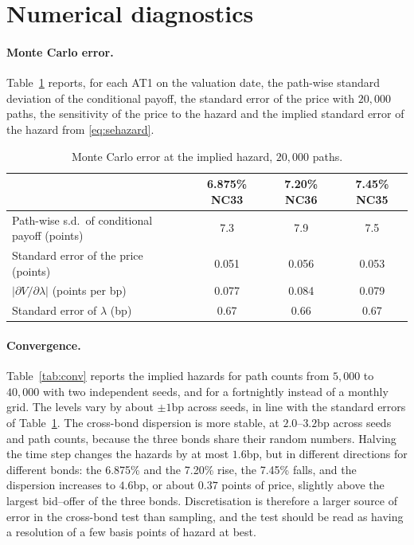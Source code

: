 

\section{Numerical diagnostics}\label{app:numerics}

\paragraph{Monte Carlo error.} Table~\ref{tab:mcerr} reports, for each AT1 on the valuation
date, the path-wise standard deviation of the conditional payoff, the standard error of the
price with $20{,}000$ paths, the sensitivity of the price to the hazard and the implied
standard error of the hazard from \eqref{eq:sehazard}.

\begin{table}[H]
\centering
\begin{tabular}{lccc}
\toprule
 & 6.875\% NC33 & 7.20\% NC36 & 7.45\% NC35 \\
\midrule
Path-wise s.d.\ of conditional payoff (points) & 7.3 & 7.9 & 7.5 \\
Standard error of the price (points) & 0.051 & 0.056 & 0.053 \\
$|\partial V/\partial\lambda|$ (points per bp) & 0.077 & 0.084 & 0.079 \\
Standard error of $\lambda$ (bp) & 0.67 & 0.66 & 0.67 \\
\bottomrule
\end{tabular}
\caption{Monte Carlo error at the implied hazard, $20{,}000$ paths.}
\label{tab:mcerr}
\end{table}

\paragraph{Convergence.} Table~\ref{tab:conv} reports the implied hazards for path counts from
$5{,}000$ to $40{,}000$ with two independent seeds, and for a fortnightly instead of a
monthly grid. The levels vary by about $\pm1$bp across seeds, in line with the standard
errors of Table~\ref{tab:mcerr}. The cross-bond dispersion is more stable, at $2.0$--$3.2$bp
across seeds and path counts, because the three bonds share their random numbers.
Halving the time step changes the hazards by at most $1.6$bp, but in different directions
for different bonds: the 6.875\% and the 7.20\% rise, the 7.45\% falls, and the dispersion
increases to $4.6$bp, or about $0.37$ points of price, slightly above the largest
bid--offer of the three bonds. Discretisation is therefore a larger source of error in
the cross-bond test than sampling, and the test should be read as having a resolution of
a few basis points of hazard at best.


